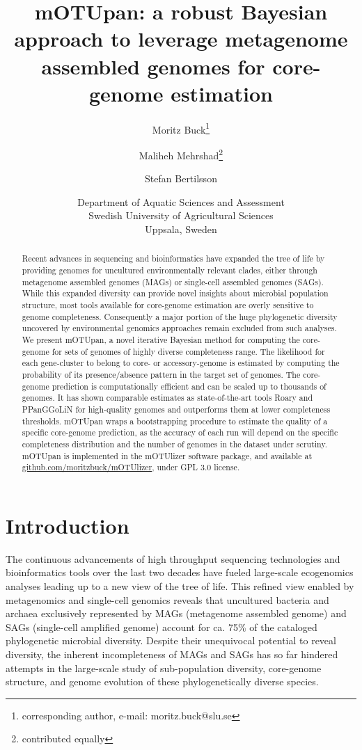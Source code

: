 \documentclass{article}
\author{Moritz Buck\thanks{corresponding author, e-mail: moritz.buck@slu.se} \and Maliheh Mehrshad\thanks{contributed equally}  \and Stefan Bertilsson\footnotemark[2]}
\date{Department of Aquatic Sciences and Assessment\\ Swedish University of Agricultural Sciences\\ Uppsala, Sweden}
\title{mOTUpan: a robust Bayesian approach to leverage metagenome assembled genomes for core-genome estimation}
\begin{document}
\maketitle

\begin{abstract}
Recent advances in sequencing and bioinformatics have expanded the tree of life by providing genomes for uncultured environmentally relevant clades, either through metagenome assembled genomes (MAGs) or single-cell assembled genomes (SAGs). While this expanded diversity can provide novel insights about microbial population structure, most tools available for core-genome estimation are overly sensitive to genome completeness. Consequently a major portion of the huge phylogenetic diversity uncovered by environmental genomics approaches remain excluded from such analyses. We present mOTUpan, a novel iterative Bayesian method for computing the core-genome for sets of genomes of highly diverse completeness range. The likelihood for each gene-cluster to belong to core- or accessory-genome is estimated by computing the probability of its presence/absence pattern in the target set of genomes. The core-genome prediction is computationally efficient and can be scaled up to thousands of genomes. It has shown comparable estimates as state-of-the-art tools Roary and PPanGGoLiN for high-quality genomes and outperforms them at lower completeness thresholds. mOTUpan wraps a bootstrapping procedure to estimate the quality of a specific core-genome prediction, as the accuracy of each run will depend on the specific completeness distribution and the number of genomes in the dataset under scrutiny. mOTUpan is implemented in the mOTUlizer software package, and available at \href{github.com/moritzbuck/mOTUlizer}{github.com/moritzbuck/mOTUlizer}, under GPL 3.0 license.
\end{abstract}

\section*{Introduction}

The continuous advancements of high throughput sequencing technologies and bioinformatics tools over the last two decades have fueled large-scale ecogenomics analyses leading up to a new view of the tree of life\citep{hug_2016, nayfach_2021, parks_2020}. This refined view enabled by metagenomics and single-cell genomics reveals that uncultured bacteria and archaea exclusively represented by MAGs (metagenome assembled genome) and SAGs (single-cell amplified genome) account for ca. 75\% of the cataloged phylogenetic microbial diversity\citep{nayfach_2021}. Despite their unequivocal potential to reveal diversity, the inherent incompleteness of MAGs and SAGs has so far hindered attempts in the large-scale study of sub-population diversity, core-genome structure, and genome evolution of these phylogenetically diverse species.
\end{document}
